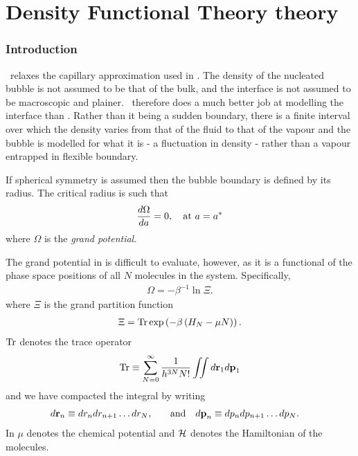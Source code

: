\chapter{Density Functional Theory theory}\label{app:DFT}


\subsection{Introduction}

\Dft\ relaxes the capillary approximation used in \cnt.
The density of the nucleated bubble is not assumed to be that of the bulk,
and the interface is not assumed to be macroscopic and plainer\cite{Oxtoby1992, Oxtoby1998}.
\Dft\ therefore does a much better job at modelling the interface than \cnt.
Rather than it being a sudden boundary,
there is a finite interval over which the density varies from that of the fluid to that of the vapour
and the bubble is modelled for what it is -  a fluctuation in density - 
rather than a vapour entrapped in  flexible boundary.

If  spherical symmetry is assumed then 
the bubble boundary is defined by its radius.
The critical radius is such that\cite{Oxtoby1992,Oxtoby1998}
\begin{align}
  \frac{d \Omega}{d a} =0,\quad\text{at $a = {a^\ast}$} \label{eqn:DFT:astarR}
\end{align}
where $\Omega$ is the {\em grand potential}.


The grand potential in  is difficult to evaluate, however,
as it is a functional of the 
phase space positions of all $N$ molecules in the system.
Specifically,  
\begin{align}
  \Omega = -\beta^{-1}\ln \Xi.
\end{align}
where $\Xi$ is the grand partition function
\begin{align}
  \Xi = \textrm{Tr} \exp\left( -\beta \left( H_N - \mu N \right) \right). \label{eqn:nuc:GPF}
\end{align}
 $\textrm{Tr}$ denotes the trace operator
\begin{align}
  \textrm{Tr} \equiv \sum_{N=0}^\infty \frac{1}{h^{3N}N!} \iint d{\mathbf{\textbf{r}}}_1 d{\mathbf{\textbf{p}}}_1
\end{align}
and we have compacted the integral by writing 
\begin{align}
d{\mathbf{\textbf{r}}}_n &\equiv dr_n dr_{n+1}\ldots dr_N, &&\quad\text{and}&
d{\mathbf{\textbf{p}}}_n &\equiv  dp_n dp_{n+1}\ldots dp_N.
\label{eqn:dshorthand}
\end{align}
In  $\mu$ denotes the chemical potential and ${\cal H}$ denotes the Hamiltonian of the molecules.

